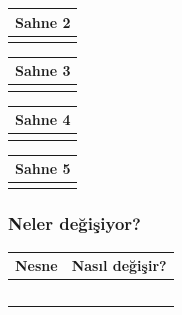 \documentclass[12pt, a4paper]{article}
\begin{document}
\vspace{5ex}
\noindent
\begin{tabular}{| p{16.5cm}  |  }
\hline			
Sahne 2\\
\hline
\\[50ex]
\hline  
\end{tabular}

\vspace{5ex}
\noindent
\begin{tabular}{| p{16.5cm}  |  }
\hline			
Sahne 3\\
\hline
\\[50ex]
\hline  
\end{tabular}

\vspace{5ex}
\noindent
\begin{tabular}{| p{16.5cm}  |  }
\hline			
Sahne 4\\
\hline
\\[50ex]
\hline  
\end{tabular}

\vspace{5ex}
\noindent
\begin{tabular}{| p{16.5cm}  |  }
\hline			
Sahne 5\\
\hline
\\[50ex]
\hline  
\end{tabular}

\subsubsection*{Neler değişiyor?}
\begin{tabular}{| p{4cm} | p{11cm} |  }
\hline			
Nesne&Nasıl değişir?\\
\hline
& \\[6ex]
\hline  
& \\[6ex]
\hline  
& \\[6ex]
\hline  
& \\[6ex]
\hline  
& \\[6ex]
\hline  
\end{tabular}

\end{document}
